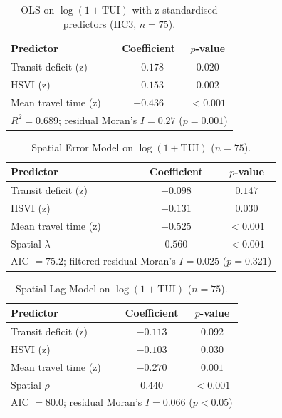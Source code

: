 \documentclass[10pt, a4paper]{article}
\begin{document}
\begin{table}[htbp]
    \centering
    \caption{OLS on $\log(1+\mathrm{TUI})$ with z-standardised predictors (HC3, $n=75$).}
    \label{tab:ols}
    \begin{tabular}{|l|c|c|}
        \hline
        \textbf{Predictor} & \textbf{Coefficient} & \textbf{$p$-value} \\
        \hline
        Transit deficit (z)   & $-0.178$ & $0.020$ \\
        HSVI (z)              & $-0.153$ & $0.002$ \\
        Mean travel time (z)  & $-0.436$ & $<0.001$ \\
        \hline
        \multicolumn{3}{|l|}{$R^2 = 0.689$; residual Moran's $I = 0.27$ ($p = 0.001$)} \\
        \hline
    \end{tabular}
\end{table}

\begin{table}[htbp]
    \centering
    \caption{Spatial Error Model on $\log(1+\mathrm{TUI})$ ($n=75$).}
    \label{tab:sem}
    \begin{tabular}{|l|c|c|}
        \hline
        \textbf{Predictor} & \textbf{Coefficient} & \textbf{$p$-value} \\
        \hline
        Transit deficit (z)   & $-0.098$ & $0.147$ \\
        HSVI (z)              & $-0.131$ & $0.030$ \\
        Mean travel time (z)  & $-0.525$ & $<0.001$ \\
        Spatial $\lambda$     & $0.560$  & $<0.001$ \\
        \hline
        \multicolumn{3}{|l|}{AIC $= 75.2$; filtered residual Moran's $I = 0.025$ ($p = 0.321$)} \\
        \hline
    \end{tabular}
\end{table}

\begin{table}[htbp]
    \centering
    \caption{Spatial Lag Model on $\log(1+\mathrm{TUI})$ ($n=75$).}
    \label{tab:slag}
    \begin{tabular}{|l|c|c|}
        \hline
        \textbf{Predictor} & \textbf{Coefficient} & \textbf{$p$-value} \\
        \hline
        Transit deficit (z)   & $-0.113$ & $0.092$ \\
        HSVI (z)              & $-0.103$ & $0.030$ \\
        Mean travel time (z)  & $-0.270$ & $0.001$ \\
        Spatial $\rho$        & $0.440$  & $<0.001$ \\
        \hline
        \multicolumn{3}{|l|}{AIC $= 80.0$; residual Moran's $I = 0.066$ ($p < 0.05$)} \\
        \hline
    \end{tabular}
\end{table}
\end{document}
